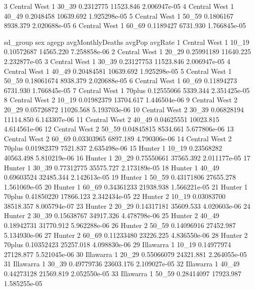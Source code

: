 \documentclass[a4paper]{article}                %
\begin{document}
\begin{Schunk}
\begin{Soutput}
3 Central West   1 30_39        0.2312775 11523.846 2.006947e-05
4 Central West   1 40_49        0.2048458 10639.692 1.925298e-05
5 Central West   1 50_59        0.1806167  8938.379 2.020688e-05
6 Central West   1 60_69        0.1189427  6731.930 1.766845e-05
\end{Soutput}
\begin{Soutput}
       sd_group sex  agegp avgMonthlyDeaths    avgPop      avgRate
1  Central West   1  10_19       0.10572687 14565.220 7.258858e-06
2  Central West   1  20_29       0.25991189 11640.225 2.232877e-05
3  Central West   1  30_39       0.23127753 11523.846 2.006947e-05
4  Central West   1  40_49       0.20484581 10639.692 1.925298e-05
5  Central West   1  50_59       0.18061674  8938.379 2.020688e-05
6  Central West   1  60_69       0.11894273  6731.930 1.766845e-05
7  Central West   1 70plus       0.12555066  5339.344 2.351425e-05
8  Central West   2  10_19       0.01982379 13704.617 1.446504e-06
9  Central West   2  20_29       0.05726872 11026.568 5.193703e-06
10 Central West   2  30_39       0.06828194 11114.850 6.143307e-06
11 Central West   2  40_49       0.04625551 10023.815 4.614561e-06
12 Central West   2  50_59       0.04845815  8534.661 5.677806e-06
13 Central West   2  60_69       0.03303965  6897.189 4.790306e-06
14 Central West   2 70plus       0.01982379  7521.837 2.635498e-06
15       Hunter   1  10_19       0.23568282 40563.498 5.810219e-06
16       Hunter   1  20_29       0.75550661 37565.392 2.011177e-05
17       Hunter   1  30_39       0.77312775 35575.727 2.173189e-05
18       Hunter   1  40_49       0.69603524 32485.344 2.142613e-05
19       Hunter   1  50_59       0.43171806 27655.278 1.561069e-05
20       Hunter   1  60_69       0.34361233 21938.938 1.566221e-05
21       Hunter   1 70plus       0.41850220 17866.123 2.342434e-05
22       Hunter   2  10_19       0.03083700 38518.357 8.005794e-07
23       Hunter   2  20_29       0.14317181 35609.533 4.020603e-06
24       Hunter   2  30_39       0.15638767 34917.326 4.478798e-06
25       Hunter   2  40_49       0.18942731 31770.912 5.962288e-06
26       Hunter   2  50_59       0.14096916 27452.987 5.134930e-06
27       Hunter   2  60_69       0.11233480 23226.225 4.836550e-06
28       Hunter   2 70plus       0.10352423 25257.018 4.098830e-06
29    Illawarra   1  10_19       0.14977974 27128.877 5.521045e-06
30    Illawarra   1  20_29       0.55066079 24321.881 2.264055e-05
31    Illawarra   1  30_39       0.49779736 23603.176 2.109027e-05
32    Illawarra   1  40_49       0.44273128 21569.819 2.052550e-05
33    Illawarra   1  50_59       0.28414097 17923.987 1.585255e-05

\end{Soutput}
\end{Schunk}
\end{document}
